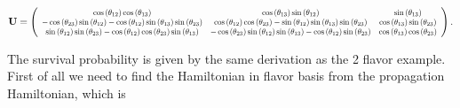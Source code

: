\documentclass{tufte-handout}
\begin{document}
\begin{equation*}
\mathbf{U} = \left(
\scalemath{0.8}{
\begin{array}{ccc}
 \cos \left(\theta _{12}\right) \cos \left(\theta _{13}\right) & \cos \left(\theta _{13}\right) \sin \left(\theta _{12}\right) & \sin \left(\theta _{13}\right) \\
 -\cos \left(\theta _{23}\right) \sin \left(\theta _{12}\right)-\cos \left(\theta _{12}\right) \sin \left(\theta _{13}\right) \sin \left(\theta _{23}\right) & \cos \left(\theta _{12}\right) \cos \left(\theta _{23}\right)-\sin \left(\theta _{12}\right) \sin \left(\theta _{13}\right) \sin \left(\theta _{23}\right) & \cos \left(\theta _{13}\right) \sin \left(\theta _{23}\right) \\
 \sin \left(\theta _{12}\right) \sin \left(\theta _{23}\right)-\cos \left(\theta _{12}\right) \cos \left(\theta _{23}\right) \sin \left(\theta _{13}\right) & -\cos \left(\theta _{23}\right) \sin \left(\theta _{12}\right) \sin \left(\theta _{13}\right)-\cos \left(\theta _{12}\right) \sin \left(\theta _{23}\right) & \cos \left(\theta _{13}\right) \cos \left(\theta _{23}\right) \\
\end{array}
}
\right).
\end{equation*}




The survival probability is given by the same derivation as the 2 flavor example. First of all we need to find the Hamiltonian in flavor basis from the propagation Hamiltonian, which is 
\end{document}
